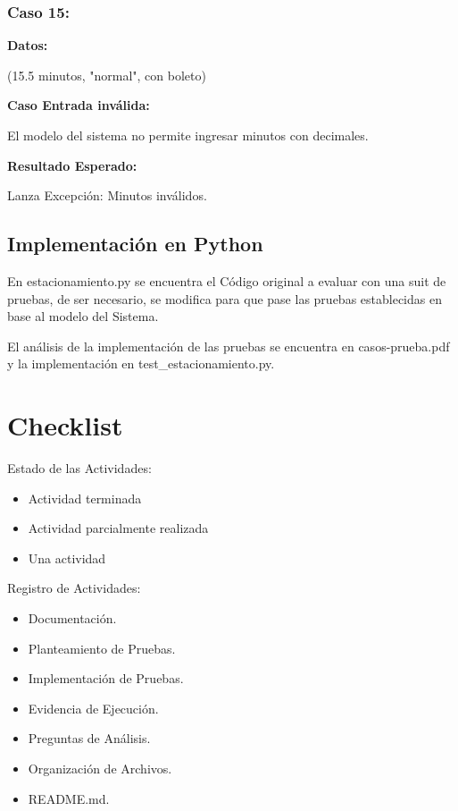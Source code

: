 \documentclass[11pt,letterpaper]{article}
\begin{document}
\subsubsection{Caso 15:}
\label{sec:orgdc9a689}

\textbf{Datos:}

(15.5 minutos, "normal", con boleto)

\textbf{Caso Entrada inválida:}

El modelo del sistema no permite ingresar minutos con decimales.

\textbf{Resultado Esperado:}

Lanza Excepción: Minutos inválidos.


\subsection{Implementación en Python}
\label{sec:org66d0ffe}

En estacionamiento.py se encuentra el Código original a evaluar con una suit de pruebas, de ser necesario, se modifica para que pase las pruebas establecidas en base al modelo del Sistema.

\vspace{\baselineskip}

El análisis de la implementación de las pruebas se encuentra en casos-prueba.pdf y la implementación en test\_estacionamiento.py.

\section{Checklist}
\label{sec:orga525e71}

Estado de las Actividades:

\begin{itemize}
\item[{$\boxtimes$}] Actividad terminada
\item[{$\boxminus$}] Actividad parcialmente realizada
\item[{$\square$}] Una actividad
\end{itemize}

Registro de Actividades:

\begin{itemize}
\item[{$\boxtimes$}] Documentación.
\item[{$\boxtimes$}] Planteamiento de Pruebas.
\item[{$\boxtimes$}] Implementación de Pruebas.
\item[{$\boxtimes$}] Evidencia de Ejecución.
\item[{$\boxtimes$}] Preguntas de Análisis.
\item[{$\boxtimes$}] Organización de Archivos.
\item[{$\boxtimes$}] README.md.
\end{itemize}
\end{document}
